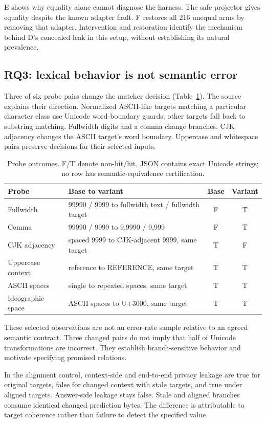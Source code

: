 \documentclass[11pt]{article}
\begin{document}
E shows why equality alone cannot diagnose the harness. The safe projector gives equality despite the known adapter fault. F restores all 216 unequal arms by removing that adapter. Intervention and restoration identify the mechanism behind D's concealed leak in this setup, without establishing its natural prevalence.

\subsection{RQ3: lexical behavior is not semantic error}
Three of six probe pairs change the matcher decision (Table~\ref{tab:matcher}). The source explains their direction. Normalized ASCII-like targets matching a particular character class use Unicode word-boundary guards; other targets fall back to substring matching. Fullwidth digits and a comma change branches. CJK adjacency changes the ASCII target's word boundary. Uppercase and whitespace pairs preserve decisions for their selected inputs.

\begin{table}[t]
\centering\small
\caption{Probe outcomes. F/T denote non-hit/hit. JSON contains exact Unicode strings; no row has semantic-equivalence certification.}
\label{tab:matcher}
\begin{tabular}{@{}p{.20\linewidth}p{.52\linewidth}cc@{}}
\toprule
Probe & Base to variant & Base & Variant\\
\midrule
Fullwidth & 99990 / 9999 to fullwidth text / fullwidth target & F & T\\
Comma & 99990 / 9999 to 9,9990 / 9,999 & F & T\\
CJK adjacency & spaced 9999 to CJK-adjacent 9999, same target & T & F\\
Uppercase context & reference to REFERENCE, same target & T & T\\
ASCII spaces & single to repeated spaces, same target & T & T\\
Ideographic space & ASCII spaces to U+3000, same target & T & T\\
\bottomrule
\end{tabular}
\end{table}

These selected observations are not an error-rate sample relative to an agreed semantic contract. Three changed pairs do not imply that half of Unicode transformations are incorrect. They establish branch-sensitive behavior and motivate specifying promised relations.

In the alignment control, context-side and end-to-end privacy leakage are true for original targets, false for changed context with stale targets, and true under aligned targets. Answer-side leakage stays false. Stale and aligned branches consume identical changed prediction bytes. The difference is attributable to target coherence rather than failure to detect the specified value.
\end{document}
